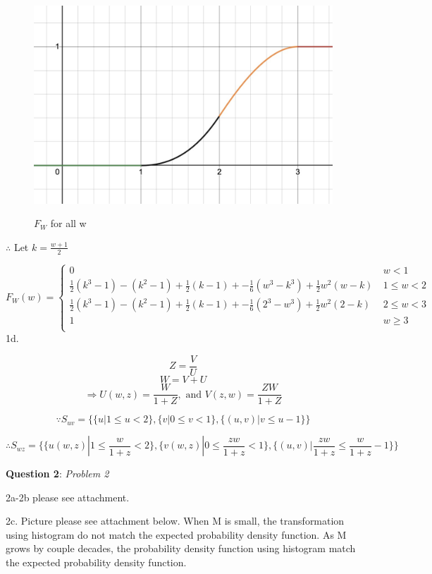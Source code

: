 \documentclass{article} %
\newcommand{\question}[2][]{\begin{flushleft}
        \textbf{Question #1}: \textit{#2}

\end{flushleft}}
\begin{document}
    \begin{figure}[]
        \centering
        \includegraphics[scale=0.20]{HW/HW4/p1c_fw.jpg}
        \label{fig:$F_W,all$}
        \caption{$F_W$ for all w}    
    \end{figure}

    $\therefore$ Let $k=\frac{w+1}{2}$
    
    $F_W(w) = \left\{ \begin{array}{cl}
        0  &  \ w < 1 \\
        \frac{1}{2}(k^3-1)-(k^2-1)+\frac{1}{2}(k-1)+-\frac{1}{6}(w^3-k^3)+\frac{1}{2}w^2(w-k) &  \ 1 \leq w < 2 \\
        \frac{1}{2}(k^3-1)-(k^2-1)+\frac{1}{2}(k-1)+-\frac{1}{6}(2^3-w^3)+\frac{1}{2}w^2(2-k)  &  \ 2 \leq w < 3 \\
        1 &  \ w \geq 3 \\
        \end{array} \right.$
\newpage
    1d.

    $$Z = \frac{V}{U}$$
    $$W = V+U$$
    $$\Rightarrow U(w,z)=\frac{W}{1+Z}, \text{ and } V(z,w)=\frac{ZW}{1+Z}$$

    $$\because S_{uv}=\{{\{u| 1 \leq u < 2\},\{v| 0 \leq v < 1\},\{(u,v)| v \leq u-1 \}}\}$$

    $$\therefore S_{wz}=\{{\{u(w,z)| 1 \leq \frac{w}{1+z} < 2\},\{v(w,z)| 0 \leq \frac{zw}{1+z} < 1\},\{(u,v)| \frac{zw}{1+z} \leq \frac{w}{1+z}-1 \}}\}$$
    \question[2]{Problem 2}
    
    2a-2b please see attachment.

    2c. Picture please see attachment below. When M is small, the transformation using histogram do not match the expected probability density function. As M grows by couple decades, the probability density function using histogram match the expected probability density function.  
    
    
\end{document}

